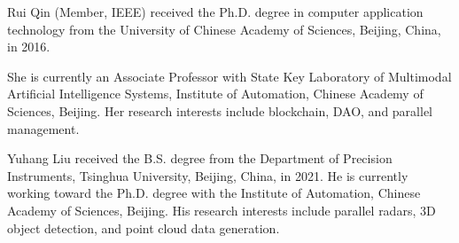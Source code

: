 \documentclass[lettersize,journal]{IEEEtran}
\begin{document}
\vspace{-33pt}

\begin{IEEEbiography}{Rui Qin}
  (Member, IEEE) received the Ph.D. degree in computer application technology from the University of Chinese Academy of Sciences, Beijing, China, in 2016.

  She is currently an Associate Professor with State Key Laboratory of Multimodal Artificial Intelligence Systems, Institute of Automation, Chinese Academy of Sciences, Beijing. Her research interests include blockchain, DAO, and parallel management.
\end{IEEEbiography}

\vspace{-33pt}

\begin{IEEEbiography}{Yuhang Liu}
  received the B.S. degree from the Department of Precision Instruments, Tsinghua University, Beijing, China, in 2021. He is currently working toward the Ph.D. degree with the Institute of Automation, Chinese Academy of Sciences, Beijing. His research interests include parallel radars, 3D object detection, and point cloud data generation.
\end{IEEEbiography}

\vspace{-33pt}
\end{document}
